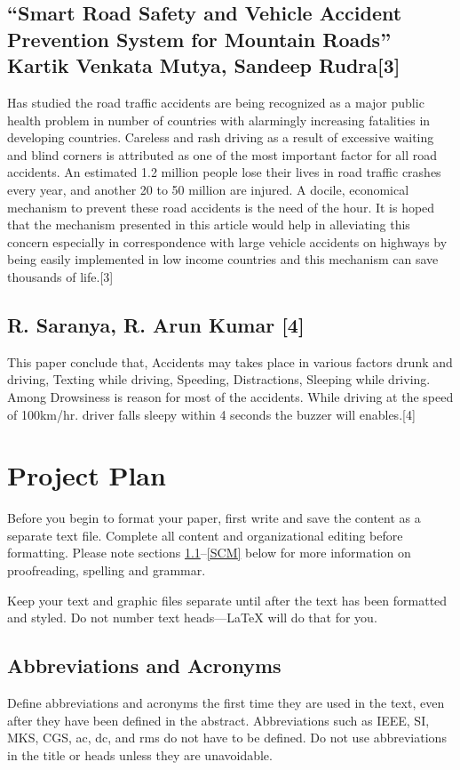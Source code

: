 \documentclass[conference]{IEEEtran}
\begin{document}
    \subsection{“Smart Road Safety and Vehicle Accident Prevention System for Mountain Roads” Kartik Venkata Mutya, Sandeep Rudra[3]}
    Has studied the road traffic accidents are being recognized as a major public health problem in number of countries with alarmingly
    increasing fatalities in developing countries. Careless and rash driving as a result of excessive waiting and blind corners is attributed
    as one of the most important factor for all road accidents. An estimated 1.2 million people lose their lives in road traffic crashes
    every year, and another 20 to 50 million are injured. A docile, economical mechanism to prevent these road accidents is the need of
    the hour. It is hoped that the mechanism presented in this article would help in alleviating this concern especially in correspondence
    with large vehicle accidents on highways by being easily implemented in low income countries and this mechanism can save
    thousands of life.[3]
    
    \subsection{R. Saranya, R. Arun Kumar [4]}
    This paper conclude that, Accidents may takes place in various factors drunk and driving, Texting while driving, Speeding,
    Distractions, Sleeping while driving. Among Drowsiness is reason for most of the accidents. While driving at the speed of
    100km/hr. driver falls sleepy within 4 seconds the buzzer will enables.[4]
    \section{Project Plan}
    Before you begin to format your paper, first write and save the content as a
    separate text file. Complete all content and organizational editing before
    formatting. Please note sections \ref{AA}--\ref{SCM} below for more information on
    proofreading, spelling and grammar.

    Keep your text and graphic files separate until after the text has been
    formatted and styled. Do not number text heads---{\LaTeX} will do that
    for you.

    \subsection{Abbreviations and Acronyms}\label{AA}
    Define abbreviations and acronyms the first time they are used in the text,
    even after they have been defined in the abstract. Abbreviations such as
    IEEE, SI, MKS, CGS, ac, dc, and rms do not have to be defined. Do not use
    abbreviations in the title or heads unless they are unavoidable.
\end{document}
